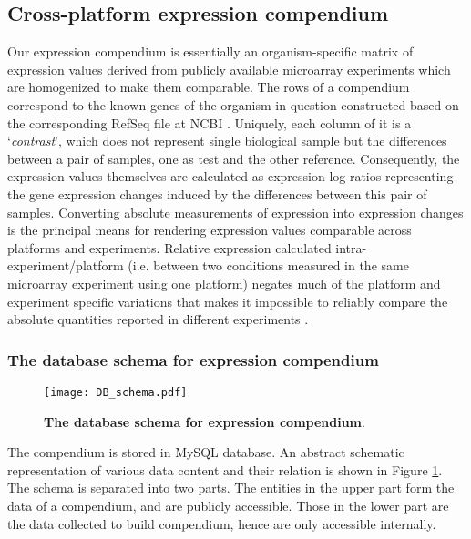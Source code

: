 \subsection{Cross-platform expression compendium}

Our expression compendium is essentially an organism-specific matrix of
expression values derived from publicly available microarray experiments which
are homogenized to make them comparable.
%
The rows of a compendium correspond to the known genes of the organism in
question constructed based on the corresponding RefSeq file at NCBI
\cite{Pruitt2007}.
%
Uniquely, each column of it is a `\textit{contrast}', which does not represent
single biological sample but the differences between a pair of samples, one as
test and the other reference.
%
Consequently, the expression values themselves are calculated as expression
log-ratios representing the gene expression changes induced by the differences
between this pair of samples.
%
Converting absolute measurements of expression into expression changes is the
principal means for rendering expression values comparable across platforms and
experiments.
%
Relative expression calculated intra-experiment/platform (i.e. between two
conditions measured in the same microarray experiment using one platform)
negates much of the platform and experiment specific variations that makes it
impossible to reliably compare the absolute quantities reported in different
experiments \cite{Shi2006}.



\subsubsection{The database schema for expression compendium}\label{sec:command-db-schema}

\begin{figure}
  \centering
  \texttt{[image: DB\_schema.pdf]}
  \caption[The database schema for expression compendium]{ \textbf{The
      database schema for expression compendium}.
  }
  \label{fig:comp-db-schema}
\end{figure}

The compendium is stored in MySQL database. An abstract schematic
representation of various data content and their relation is shown in Figure
\ref{fig:comp-db-schema}.
%
The schema is separated into two parts. The entities in the upper part form
the data of a compendium, and are publicly accessible.
%
Those in the lower part are the data collected to build compendium, hence are
only accessible internally.

